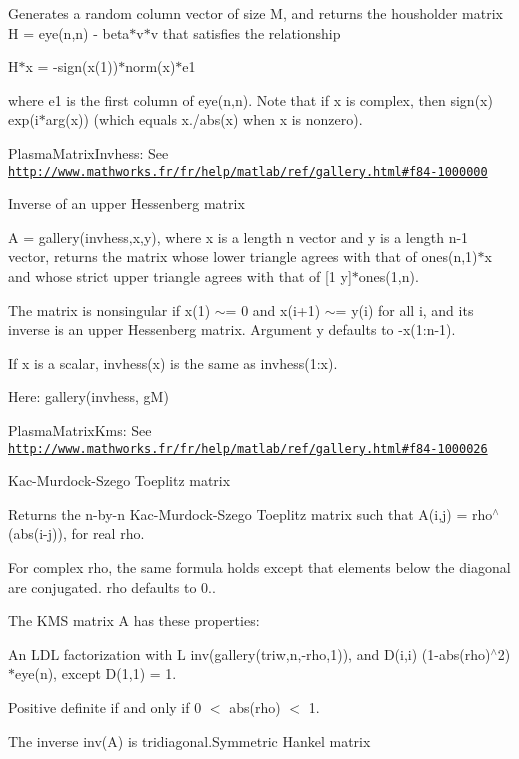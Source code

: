 Generates a random column vector of size M, and returns the housholder matrix H = eye(n,n) -\/ beta$\ast$v$\ast$v\textquotesingle{} that satisfies the relationship

H$\ast$x = -\/sign(x(1))$\ast$norm(x)$\ast$e1

where e1 is the first column of eye(n,n). Note that if x is complex, then sign(x) exp(i$\ast$arg(x)) (which equals x./abs(x) when x is nonzero).

\begin{DoxyItemize}
\item Plasma\+Matrix\+Invhess\+: See \href{http://www.mathworks.fr/fr/help/matlab/ref/gallery.html#f84-1000000}{\tt http\+://www.\+mathworks.\+fr/fr/help/matlab/ref/gallery.\+html\#f84-\/1000000}\end{DoxyItemize}
Inverse of an upper Hessenberg matrix

A = gallery(\textquotesingle{}invhess\textquotesingle{},x,y), where x is a length n vector and y is a length n-\/1 vector, returns the matrix whose lower triangle agrees with that of ones(n,1)$\ast$x\textquotesingle{} and whose strict upper triangle agrees with that of \mbox{[}1 y\mbox{]}$\ast$ones(1,n).

The matrix is nonsingular if x(1) $\sim$= 0 and x(i+1) $\sim$= y(i) for all i, and its inverse is an upper Hessenberg matrix. Argument y defaults to -\/x(1\+:n-\/1).

If x is a scalar, invhess(x) is the same as invhess(1\+:x).

Here\+: gallery(\textquotesingle{}invhess\textquotesingle{}, g\+M)

\begin{DoxyItemize}
\item Plasma\+Matrix\+Kms\+: See \href{http://www.mathworks.fr/fr/help/matlab/ref/gallery.html#f84-1000026}{\tt http\+://www.\+mathworks.\+fr/fr/help/matlab/ref/gallery.\+html\#f84-\/1000026}\end{DoxyItemize}
Kac-\/\+Murdock-\/\+Szego Toeplitz matrix

Returns the n-\/by-\/n Kac-\/\+Murdock-\/\+Szego Toeplitz matrix such that A(i,j) = rho$^\wedge$(abs(i-\/j)), for real rho.

For complex rho, the same formula holds except that elements below the diagonal are conjugated. rho defaults to 0..

The K\+M\+S matrix A has these properties\+:
\begin{DoxyItemize}
\item An L\+D\+L\textquotesingle{} factorization with L inv(gallery(\textquotesingle{}triw\textquotesingle{},n,-\/rho,1))\textquotesingle{}, and D(i,i) (1-\/abs(rho)$^\wedge$2)$\ast$eye(n), except D(1,1) = 1.
\item Positive definite if and only if 0 $<$ abs(rho) $<$ 1.
\item The inverse inv(\+A) is tridiagonal.\+Symmetric Hankel matrix
\end{DoxyItemize}


